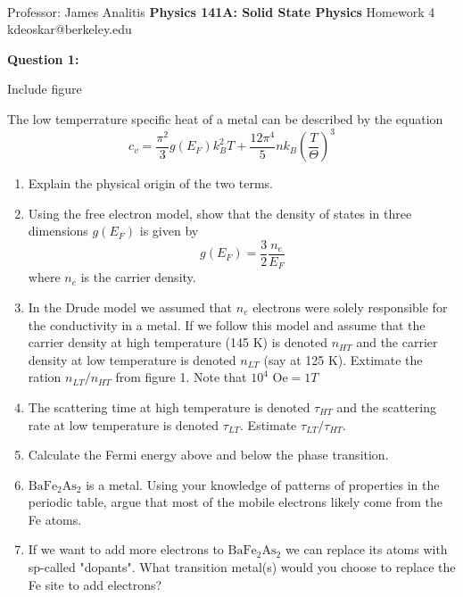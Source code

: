 \documentclass[11pt]{article}
\begin{document}
\thispagestyle{empty}
\bigskip \
\vspace{0.1cm}

\begin{center}
{\fontsize{22}{22} \selectfont Professor: James Analitis}
\vskip 16pt
{\fontsize{30}{30} \selectfont \bf \sffamily Physics 141A: Solid State Physics}
\vskip 24pt
{\fontsize{14}{14} \selectfont \rmfamily Homework 4} 
\vskip 6pt
{\fontsize{14}{14} \selectfont \ttfamily kdeoskar@berkeley.edu} 
\vskip 24pt
\end{center}




\begin{bluebox}
  \textbf{Question 1:} \\
  \begin{center}
    Include figure
  \end{center}
  The low temperrature specific heat of a metal can be described by the equation $$c_v = \frac{\pi^2}{3} g(E_F) k_B^2 T + \frac{12\pi^4}{5} nk_B \left(\frac{T}{\Theta}\right)^3 $$
  \begin{enumerate}
    \item Explain the physical origin of the two terms.
    \item Using the free electron model, show that the density of states in three dimensions $g(E_F)$ is given by $$ g(E_F) = \frac{3}{2} \frac{n_e}{E_F} $$ where $n_e$ is the carrier density.
    \item In the Drude model we assumed that $n_e$ electrons were solely responsible for the conductivity in a metal. If we follow this model and assume that the carrier density at high temperature (145 K) is denoted $n_{HT}$ and the carrier density at low temperature is denoted $n_{LT}$ (say at 125 K). Extimate the ration $n_{LT} / n_{HT}$ from figure 1. Note that $10^4\text{ Oe} = 1T$ 
    \item The scattering time at high temperature is denoted $\tau_{HT}$ and the scattering rate at low temperature is denoted $\tau_{LT}$. Estimate $\tau_{LT} / \tau_{HT}$. 
    \item Calculate the Fermi energy above and below the phase transition. 
    \item $\mathrm{BaFe}_2 \mathrm{As}_2$ is a metal. Using your knowledge of patterns of properties in the periodic table, argue that most of the mobile electrons likely come from the Fe atoms.
    \item If we want to add more electrons to $\mathrm{BaFe}_2 \mathrm{As}_2$ we can replace its atoms with sp-called "dopants". What transition metal(s) would you choose to replace the Fe site to add electrons?

\end{enumerate}
\end{bluebox}
\end{document}
